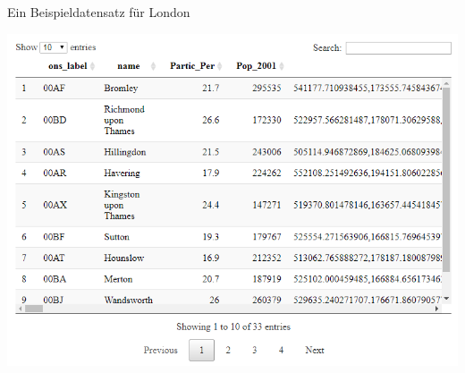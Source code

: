 \documentclass[ignorenonframetext,]{beamer}
\begin{document}
\begin{frame}{Ein Beispieldatensatz für London}
\protect\hypertarget{ein-beispieldatensatz-fur-london}{}

\includegraphics{figure/LondonExample.PNG}

\end{frame}
\end{document}
